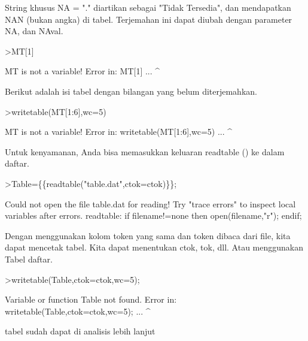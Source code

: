 \documentclass[a4paper,10pt]{article}
\begin{document}
\begin{eulernotebook}
\begin{eulercomment}
\begin{eulercomment}
\begin{eulercomment}
\begin{eulercomment}
\begin{eulercomment}
\begin{eulercomment}
\begin{eulercomment}
\begin{eulercomment}
\begin{eulercomment}
\begin{eulercomment}
\begin{eulercomment}
String khusus NA = "." diartikan sebagai "Tidak Tersedia", dan
mendapatkan NAN (bukan angka) di tabel. Terjemahan ini dapat diubah
dengan parameter NA, dan NAval.
\end{eulercomment}
\begin{eulerprompt}
>MT[1]
\end{eulerprompt}
\begin{euleroutput}
  MT is not a variable!
  Error in:
  MT[1] ...
       ^
\end{euleroutput}
\begin{eulercomment}
Berikut adalah isi tabel dengan bilangan yang belum diterjemahkan.
\end{eulercomment}
\begin{eulerprompt}
>writetable(MT[1:6],wc=5)
\end{eulerprompt}
\begin{euleroutput}
  MT is not a variable!
  Error in:
  writetable(MT[1:6],wc=5) ...
                    ^
\end{euleroutput}
\begin{eulercomment}
Untuk kenyamanan, Anda bisa memasukkan keluaran readtable () ke dalam\\
daftar.
\end{eulercomment}
\begin{eulerprompt}
>Table=\{\{readtable("table.dat",ctok=ctok)\}\}; 
\end{eulerprompt}
\begin{euleroutput}
  Could not open the file
  table.dat
  for reading!
  Try "trace errors" to inspect local variables after errors.
  readtable:
      if filename!=none then open(filename,"r"); endif;
\end{euleroutput}
\begin{eulercomment}
Dengan menggunakan kolom token yang sama dan token dibaca dari file,
kita dapat mencetak tabel. Kita dapat menentukan ctok, tok, dll. Atau
menggunakan Tabel daftar.
\end{eulercomment}
\begin{eulerprompt}
>writetable(Table,ctok=ctok,wc=5);
\end{eulerprompt}
\begin{euleroutput}
  Variable or function Table not found.
  Error in:
  writetable(Table,ctok=ctok,wc=5); ...
                  ^
\end{euleroutput}
\begin{eulercomment}
tabel sudah dapat di analisis lebih lanjut
\end{eulercomment}

\end{eulercomment}
\end{eulercomment}
\end{eulercomment}
\end{eulercomment}
\end{eulercomment}
\end{eulercomment}
\end{eulercomment}
\end{eulercomment}
\end{eulercomment}
\end{eulercomment}
\end{eulernotebook}
\end{document}

